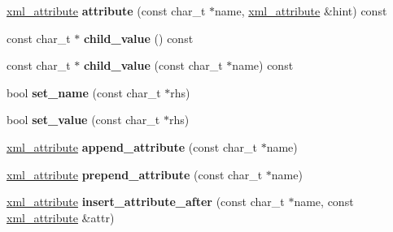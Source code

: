\begin{DoxyCompactItemize}
\item 
\hypertarget{classpugi_1_1xml__node_adba5080f639116c53b5555c3582acfaf}{\hyperlink{classpugi_1_1xml__attribute}{xml\+\_\+attribute} {\bfseries attribute} (const char\+\_\+t $\ast$name, \hyperlink{classpugi_1_1xml__attribute}{xml\+\_\+attribute} \&hint) const }\label{classpugi_1_1xml__node_adba5080f639116c53b5555c3582acfaf}

\item 
\hypertarget{classpugi_1_1xml__node_a1c824a58d4c591c0da8f5dc39938456f}{const char\+\_\+t $\ast$ {\bfseries child\+\_\+value} () const }\label{classpugi_1_1xml__node_a1c824a58d4c591c0da8f5dc39938456f}

\item 
\hypertarget{classpugi_1_1xml__node_ad091dcc0ff970fb2920b8b2942154c94}{const char\+\_\+t $\ast$ {\bfseries child\+\_\+value} (const char\+\_\+t $\ast$name) const }\label{classpugi_1_1xml__node_ad091dcc0ff970fb2920b8b2942154c94}

\item 
\hypertarget{classpugi_1_1xml__node_a9d688489fcf0960e945a12480419e434}{bool {\bfseries set\+\_\+name} (const char\+\_\+t $\ast$rhs)}\label{classpugi_1_1xml__node_a9d688489fcf0960e945a12480419e434}

\item 
\hypertarget{classpugi_1_1xml__node_a160f1fa7a0eda1e5ad9d19d45f6b0e4e}{bool {\bfseries set\+\_\+value} (const char\+\_\+t $\ast$rhs)}\label{classpugi_1_1xml__node_a160f1fa7a0eda1e5ad9d19d45f6b0e4e}

\item 
\hypertarget{classpugi_1_1xml__node_a417eb03f034b432bb2800e54e38022aa}{\hyperlink{classpugi_1_1xml__attribute}{xml\+\_\+attribute} {\bfseries append\+\_\+attribute} (const char\+\_\+t $\ast$name)}\label{classpugi_1_1xml__node_a417eb03f034b432bb2800e54e38022aa}

\item 
\hypertarget{classpugi_1_1xml__node_a7d70631d6cb3624cdfc4cf9ef4abad06}{\hyperlink{classpugi_1_1xml__attribute}{xml\+\_\+attribute} {\bfseries prepend\+\_\+attribute} (const char\+\_\+t $\ast$name)}\label{classpugi_1_1xml__node_a7d70631d6cb3624cdfc4cf9ef4abad06}

\item 
\hypertarget{classpugi_1_1xml__node_a74ab20fa84dffde317f8899af628f041}{\hyperlink{classpugi_1_1xml__attribute}{xml\+\_\+attribute} {\bfseries insert\+\_\+attribute\+\_\+after} (const char\+\_\+t $\ast$name, const \hyperlink{classpugi_1_1xml__attribute}{xml\+\_\+attribute} \&attr)}\label{classpugi_1_1xml__node_a74ab20fa84dffde317f8899af628f041}


\end{DoxyCompactItemize}
